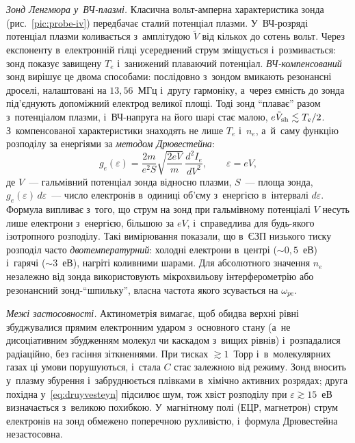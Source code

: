 \emph{Зонд Ленгмюра у~ВЧ-плазмі.} Класична вольт-амперна характеристика зонда
(рис.~\ref{pic:probe-iv}) передбачає сталий потенціал плазми. У~ВЧ-розряді потенціал плазми
коливається з~амплітудою $\tilde V$ від кількох до сотень вольт. Через експоненту в~електронній гілці
усереднений струм зміщується і~розмивається: зонд показує завищену $T_e$ і~занижений плаваючий
потенціал. \emph{ВЧ-компенсований} зонд вирішує це двома способами: послідовно з~зондом вмикають
резонансні дроселі, налаштовані на $13{,}56$~МГц і~другу гармоніку, а~через ємність до зонда під'єднують
допоміжний електрод великої площі. Тоді зонд \enquote{плаває} разом з~потенціалом плазми, і~ВЧ-напруга на
його шарі стає малою, $e\tilde V_{\rm sh}\lesssim T_e/2$. З~компенсованої характеристики знаходять
не лише $T_e$ і~$n_e$, а~й~саму функцію розподілу за енергіями за \emph{методом Дрювестейна}:
\begin{equation}\label{eq:druyvesteyn}
	g_e(\varepsilon)=\frac{2m}{e^2S}\sqrt{\frac{2e V}{m}}\,\frac{d^2I_e}{dV^2},\qquad \varepsilon=eV,
\end{equation}
де $V$~--- гальмівний потенціал зонда відносно плазми, $S$~--- площа зонда, $g_e(\varepsilon)\,d\varepsilon$~--- число
електронів в~одиниці об'єму з~енергією в~інтервалі $d\varepsilon$. Формула випливає з~того, що струм на
зонд при гальмівному потенціалі $V$ несуть лише електрони з~енергією, більшою за $eV$, і~справедлива для
будь-якого ізотропного розподілу. Такі вимірювання показали, що в~ЄЗП низького тиску розподіл часто
\emph{двотемпературний}: холодні електрони в~центрі ($\sim0{,}5$~еВ) і~гарячі ($\sim3$~еВ), нагріті коливними
шарами. Для абсолютного значення $n_e$ незалежно від зонда використовують мікрохвильову
інтерферометрію або резонансний зонд-\enquote{шпильку}, власна частота якого зсувається на
$\omega_{pe}$.

\emph{Межі застосовності.} Актинометрія вимагає, щоб обидва верхні рівні збуджувалися прямим
електронним ударом з~основного стану (а~не дисоціативним збудженням молекул чи каскадом з~вищих рівнів)
і~розпадалися радіаційно, без гасіння зіткненнями. При тисках $\gtrsim1$~Торр і~в~молекулярних
газах ці умови порушуються, і~стала $C$ стає залежною від режиму. Зонд вносить у~плазму
збурення і~забруднюється плівками в~хімічно активних розрядах; друга похідна у~\eqref{eq:druyvesteyn}
підсилює шум, тож хвіст розподілу при $\varepsilon\gtrsim15$~еВ визначається з~великою похибкою. У~магнітному
полі (ЕЦР, магнетрон) струм електронів на зонд обмежено поперечною рухливістю, і~формула Дрювестейна
незастосовна.

